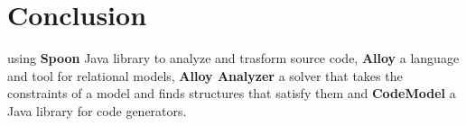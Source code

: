 \chapter*{Conclusion}
\label{ch:Conclusion}
	\thispagestyle{conclusion}
	 using \textbf{Spoon} Java library to analyze and trasform source code, \textbf{Alloy} a language and tool for relational models, \textbf{Alloy Analyzer} a solver that takes the constraints of a model and finds structures that satisfy them and \textbf{CodeModel} a Java library for code generators.